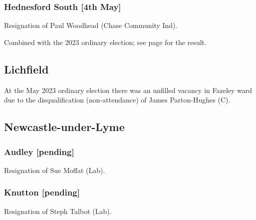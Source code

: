 \documentclass[a4paper,openany]{book}
\begin{document}
\begin{resultsiii}
\subsubsection*{Hednesford South \hspace*{\fill}\nolinebreak[1]%
	\enspace\hspace*{\fill}
	[4th May]}


Resignation of Paul Woodhead (Chase Community Ind).

Combined with the 2023 ordinary election; see page \pageref{CannockChaseHednesfordSouth} for the result.

\subsection*{Lichfield}

At the May 2023 ordinary election there was an unfilled vacancy in Fazeley ward due to the disqualification (non-attendance) of James Parton-Hughes (C).%

\subsection*{Newcastle-under-Lyme}

\subsubsection*{Audley \hspace*{\fill}\nolinebreak[1]%
	\enspace\hspace*{\fill}
	[pending]}


Resignation of Sue Moffat (Lab).

\subsubsection*{Knutton \hspace*{\fill}\nolinebreak[1]%
	\enspace\hspace*{\fill}
	[pending]}


Resignation of Steph Talbot (Lab).


\end{resultsiii}
\end{document}

